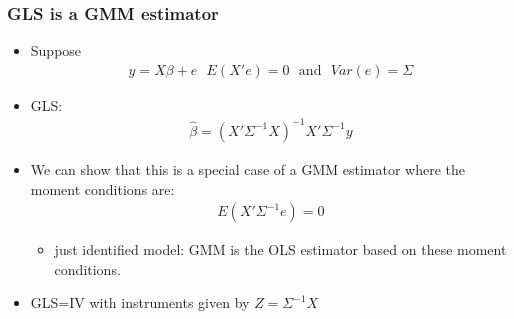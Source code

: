 \documentclass[a4paper,twoside,11pt]{article}
\begin{document}
\subsubsection{GLS is a GMM estimator}
\begin{itemize}
    \item Suppose
\begin{equation*}
\begin{aligned}
y = X \beta + e \ \ \ E(X'e) =0 \ \ \ \text{and} \ \ \ Var(e) = \Sigma
\end{aligned} 
\end{equation*}
    \item GLS:
\begin{equation*}
\begin{aligned}
\hat{\beta} = (X'\Sigma^{-1} X)^{-1} X' \Sigma^{-1} y
\end{aligned} 
\end{equation*}
    \item We can show that this is a special case of a GMM estimator where the moment conditions are:
\begin{equation*}
\begin{aligned}
E(X' \Sigma^{-1}e) = 0
\end{aligned} 
\end{equation*}
    \begin{itemize}
        \item just identified model: GMM is the OLS estimator based on these moment conditions.
    \end{itemize}
    \item GLS=IV with instruments given by $Z = \Sigma^{-1} X$
\end{itemize}
\end{document}
